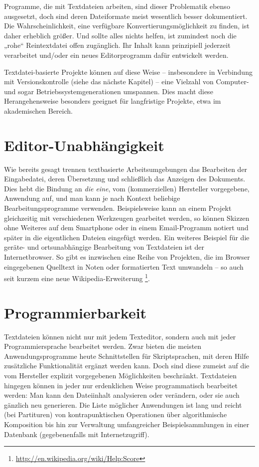 \documentclass[DIV=12]{scrreprt}
\begin{document}
Programme, die mit Textdateien arbeiten, sind dieser Problematik ebenso ausgesetzt, doch sind deren Dateiformate meist wesentlich besser dokumentiert.
Die Wahrscheinlichkeit, eine verfügbare Konvertierungsmöglichkeit zu finden, ist daher erheblich größer.
Und sollte alles nichts helfen, ist zumindest noch die „rohe“ Reintextdatei offen zugänglich.
Ihr Inhalt kann prinzipiell jederzeit verarbeitet und/oder ein neues Editorprogramm dafür entwickelt werden.

Textdatei-basierte Projekte können auf diese Weise -- insbesondere in Verbindung mit Versionskontrolle (siehe das nächste Kapitel) -- eine Vielzahl von Computer- und sogar Betriebssystemgenerationen umspannen.
Dies macht diese Herangehensweise besonders geeignet für langfristige Projekte, etwa im akademischen Bereich.

\section{Editor-Unabhängigkeit}
\label{sec:pt_editor-independence}
Wie bereits gesagt trennen textbasierte Arbeitsumgebungen das Bearbeiten der Eingabedatei, deren Übersetzung und schließlich das Anzeigen des Dokuments.
Dies hebt die Bindung an \emph{die eine}, vom (kommerziellen) Hersteller vorgegebene, Anwendung auf, und man kann je nach Kontext beliebige Bearbeitungsprogramme verwenden.
Beispielsweise kann an einem Projekt gleichzeitig mit verschiedenen Werkzeugen gearbeitet werden, so können Skizzen ohne Weiteres auf dem Smartphone oder in einem Email-Programm notiert und später in die eigentlichen Dateien eingefügt werden.
Ein weiteres Beispiel für die geräte- und ortsunabhängige Bearbeitung von Textdateien ist der Internetbrowser.
So gibt es inzwischen eine Reihe von Projekten, die im Browser eingegebenen Quelltext in Noten oder formatierten Text umwandeln -- so auch seit kurzem eine neue Wikipedia-Erweiterung%
\footnote{\url{http://en.wikipedia.org/wiki/Help:Score}}.

\section{Programmierbarkeit}
\label{sec:pt_programmability}
Textdateien können nicht nur mit jedem Texteditor, sondern auch mit jeder Programmiersprache bearbeitet werden.
Zwar bieten die meisten Anwendungsprogramme heute Schnittstellen für Skriptsprachen, mit deren Hilfe zusätzliche Funktionalität ergänzt werden kann.
Doch sind diese zumeist auf die vom Hersteller explizit vorgegebenen Möglichkeiten beschränkt.
Textdateien hingegen können in jeder nur erdenklichen Weise programmatisch bearbeitet werden: Man kann den Dateiinhalt analysieren oder verändern, oder sie auch gänzlich neu generieren.
Die Liste möglicher Anwendungen ist lang und reicht (bei Partituren) von kontrapunktischen Operationen über algorithmische Komposition bis hin zur Verwaltung umfangreicher Beispielsammlungen in einer Datenbank (gegebenenfalls mit Internetzugriff).
\end{document}
